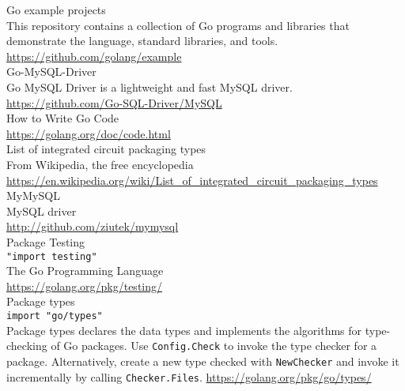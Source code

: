 \documentclass[12pt,letterpaper,dvips]{article}
\begin{document}
\noindent Go example projects\\
This repository contains a collection of Go programs
and libraries that demonstrate the language,
standard libraries, and tools.\\
\href{https://github.com/golang/example}{https://github.com/golang/example}
\\

\noindent Go-MySQL-Driver\\
Go MySQL Driver is a lightweight and fast MySQL driver.\\
\href{https://github.com/Go-SQL-Driver/MySQL/}{https://github.com/Go-SQL-Driver/MySQL}
\\

\noindent How to Write Go Code\\
\href{https://golang.org/doc/code.html}{https://golang.org/doc/code.html}
\\

\noindent List of integrated circuit packaging types\\
From Wikipedia, the free encyclopedia\\
\href{https://en.wikipedia.org/wiki/List\_of\_integrated\_circuit\_packaging\_types}{https://en.wikipedia.org/wiki/List\_of\_integrated\_circuit\_packaging\_types}
\\

\noindent MyMySQL\\
MySQL driver\\
\href{http://github.com/ziutek/mymysql}{http://github.com/ziutek/mymysql}
\\

\noindent Package Testing\\
\texttt{"import testing"}\\
The Go Programming Language\\
\href{https://golang.org/pkg/testing/}{https://golang.org/pkg/testing/}
\\

\noindent Package types\\
\texttt{import "go/types"}\\
Package types declares the data types and implements
the algorithms for type-checking of Go packages. Use
\texttt{Config.Check} to invoke the type checker for
a package.  Alternatively, create a new type checked
with \texttt{NewChecker} and invoke it incrementally
by calling \texttt{Checker.Files}.
\href{https://golang.org/pkg/go/types/}{https://golang.org/pkg/go/types/}
\\
\end{document}
